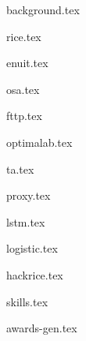 \documentclass[10pt]{article}
\begin{document}
{background.tex}


{rice.tex}


{enuit.tex}


{osa.tex}

{fttp.tex}

{optimalab.tex}

{ta.tex}





{proxy.tex}

{lstm.tex}

{logistic.tex}

{hackrice.tex}


{skills.tex}


{awards-gen.tex}
\end{document}
